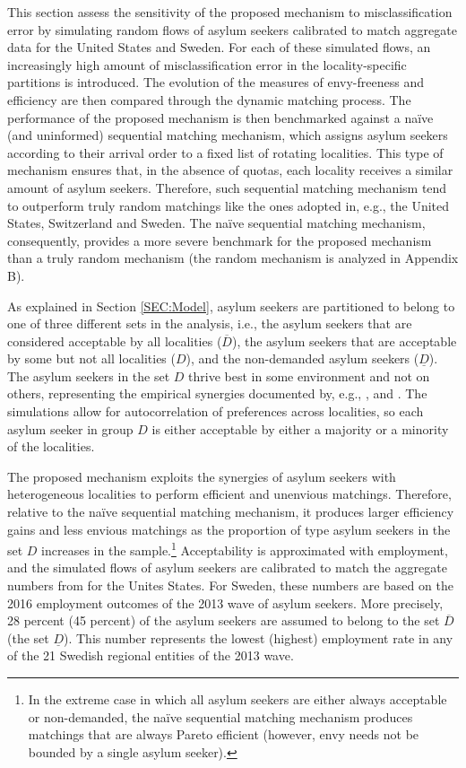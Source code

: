 \documentclass[12pt,fleqn]{article}
\begin{document}
This section assess the sensitivity of the proposed mechanism to misclassification error by simulating random flows of asylum seekers calibrated to match aggregate data for the United States and Sweden. For each of these simulated flows, an increasingly high amount of misclassification error in the locality-specific partitions is introduced. The evolution of the measures of envy-freeness and efficiency are then compared through the dynamic matching process. The performance of the proposed mechanism is then benchmarked against a na\"{i}ve (and uninformed) sequential matching mechanism, which assigns asylum seekers according to their arrival order to a fixed list of rotating localities. This type of mechanism ensures that, in the absence of quotas, each locality receives a similar amount of asylum seekers. Therefore, such sequential matching mechanism tend to outperform truly random matchings like the ones adopted in, e.g., the United States, Switzerland and Sweden. The na\"{i}ve sequential matching mechanism, consequently, provides a more severe benchmark for the proposed mechanism than a truly random mechanism (the random mechanism is analyzed in Appendix B).

As explained in Section \ref{SEC:Model}, asylum seekers are partitioned to belong to one of three different sets in the analysis, i.e., the asylum seekers that are considered acceptable by all localities ($\overline{D}$), the asylum seekers that are acceptable by some but not all localities ($D$), and the non-demanded asylum seekers ($\underline{D}$). The asylum seekers in the set $D$ thrive best in some environment and not on others, representing the empirical synergies documented by, e.g., \cite{bib:BansakEtAl}, \citet{bib:Damm} and \citet{bib:EdinEtAl}. The simulations allow for autocorrelation of preferences across localities, so each asylum seeker in group $D$ is either acceptable by either a majority or a minority of the localities.

The proposed mechanism exploits the synergies of asylum seekers with heterogeneous localities to perform efficient and unenvious matchings. Therefore, relative to the na\"{i}ve sequential matching mechanism, it produces larger efficiency gains and less envious matchings as the proportion of type asylum seekers in the set $D$ increases in the sample.\footnote{In the extreme case in which all asylum seekers are either always acceptable or non-demanded, the na\"{i}ve sequential matching mechanism produces matchings that are always Pareto efficient (however, envy needs not be bounded by a single asylum seeker).} Acceptability is approximated with employment, and the simulated flows of asylum seekers are calibrated to match the aggregate numbers from \cite{bib:BansakEtAl} for the Unites States. For Sweden, these numbers are based on the 2016 employment outcomes of the 2013 wave of asylum seekers. More precisely, 28 percent (45 percent) of the asylum seekers are assumed to belong to the set $\overline{D}$ (the set $\underline{D}$). This number represents the lowest (highest) employment rate in any of the 21 Swedish regional entities of the 2013 wave.
\end{document}
